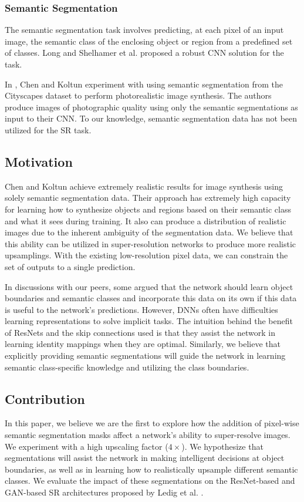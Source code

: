 \documentclass[10pt,twocolumn,letterpaper]{article}
\begin{document}
\subsubsection{Semantic Segmentation}
The semantic segmentation task involves predicting, at each pixel of an input
image, the semantic class of the enclosing object or region from a predefined
set of classes. Long and Shelhamer et al. \cite{FullyConvolutionalSS} proposed
a robust CNN solution for the task.

In \cite{ImageSynthesis}, Chen and Koltun experiment with using semantic
segmentation from the Cityscapes dataset \cite{Cityscapes} to perform
photorealistic image synthesis. The authors produce images of photographic
quality using only the semantic segmentations as input to their CNN. To our
knowledge, semantic segmentation data has not been utilized for the SR task.

\subsection{Motivation}
Chen and Koltun achieve extremely realistic results for image synthesis using
solely semantic segmentation data. Their approach has extremely high capacity
for learning how to synthesize objects and regions based on their semantic
class and what it sees during training. It also can produce a distribution of
realistic images due to the inherent ambiguity of the segmentation data.  We
believe that this ability can be utilized in super-resolution networks to
produce more realistic upsamplings. With the existing low-resolution pixel
data, we can constrain the set of outputs to a single prediction.

In discussions with our peers, some argued that the network should learn object
boundaries and semantic classes and incorporate this data on its own if this
data is useful to the network's predictions. However, DNNs often have
difficulties learning representations to solve implicit tasks.  The intuition
behind the benefit of ResNets and the skip connections used is that they assist
the network in learning identity mappings when they are optimal.  Similarly, we
believe that explicitly providing semantic segmentations will guide the network
in learning semantic class-specific knowledge and utilizing the class
boundaries.

\subsection{Contribution}
In this paper, we believe we are the first to explore how the addition of
pixel-wise semantic segmentation masks affect a network's ability to
super-resolve images. We experiment with a high upscaling factor ($4 \times$).
We hypothesize that segmentations will assist the network in making intelligent
decisions at object boundaries, as well as in learning how to realistically
upsample different semantic classes. We evaluate the impact of these
segmentations on the ResNet-based and GAN-based SR architectures proposed by
Ledig et al. \cite{SRGAN}.
\end{document}
